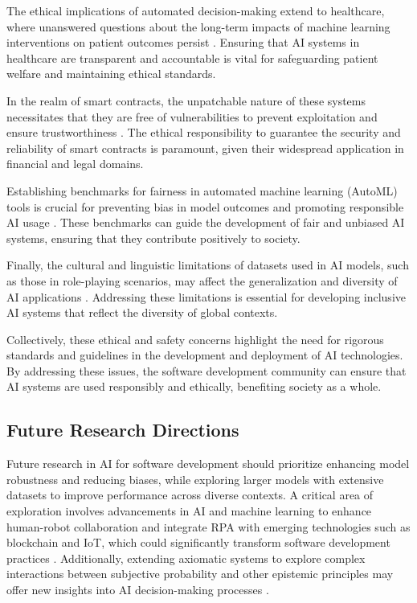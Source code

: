 The ethical implications of automated decision-making extend to healthcare, where unanswered questions about the long-term impacts of machine learning interventions on patient outcomes persist \cite{shanks2004speculationgraphcomputationarchitectures}. Ensuring that AI systems in healthcare are transparent and accountable is vital for safeguarding patient welfare and maintaining ethical standards.



In the realm of smart contracts, the unpatchable nature of these systems necessitates that they are free of vulnerabilities to prevent exploitation and ensure trustworthiness \cite{nguyen2021sguardfixingvulnerablesmart}. The ethical responsibility to guarantee the security and reliability of smart contracts is paramount, given their widespread application in financial and legal domains.



Establishing benchmarks for fairness in automated machine learning (AutoML) tools is crucial for preventing bias in model outcomes and promoting responsible AI usage \cite{narayanan2023democratizecareneedfairness}. These benchmarks can guide the development of fair and unbiased AI systems, ensuring that they contribute positively to society.



Finally, the cultural and linguistic limitations of datasets used in AI models, such as those in role-playing scenarios, may affect the generalization and diversity of AI applications \cite{tao2024rolecraftglmadvancingpersonalizedroleplaying}. Addressing these limitations is essential for developing inclusive AI systems that reflect the diversity of global contexts.



Collectively, these ethical and safety concerns highlight the need for rigorous standards and guidelines in the development and deployment of AI technologies. By addressing these issues, the software development community can ensure that AI systems are used responsibly and ethically, benefiting society as a whole.



\subsection{Future Research Directions} \label{subsec:Future Research Directions}

Future research in AI for software development should prioritize enhancing model robustness and reducing biases, while exploring larger models with extensive datasets to improve performance across diverse contexts. A critical area of exploration involves advancements in AI and machine learning to enhance human-robot collaboration and integrate RPA with emerging technologies such as blockchain and IoT, which could significantly transform software development practices \cite{pandy2024advancementsroboticsprocessautomation}. Additionally, extending axiomatic systems to explore complex interactions between subjective probability and other epistemic principles may offer new insights into AI decision-making processes \cite{cieslinski2022axiomstypefreesubjectiveprobability}.



